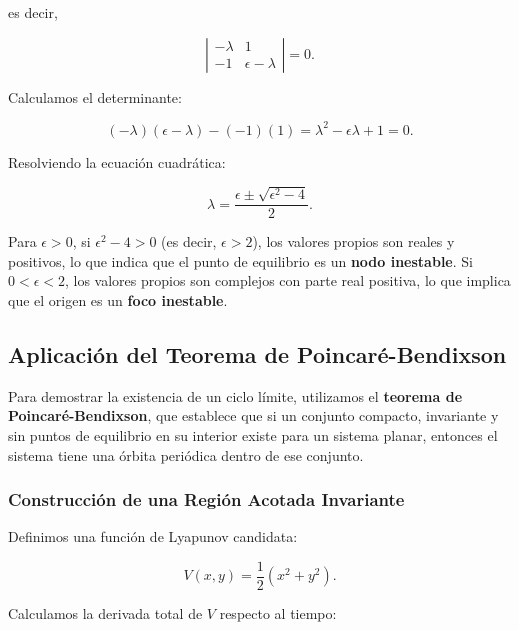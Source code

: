 \documentclass[12pt, a4paper]{report}
\begin{document}
es decir,

\begin{equation}
    \left| \begin{array}{cc}
        -\lambda & 1 \\
        -1 & \epsilon - \lambda
    \end{array} \right| = 0.
\end{equation}

Calculamos el determinante:

\begin{equation}
    (-\lambda)(\epsilon - \lambda) - (-1)(1) = \lambda^2 - \epsilon \lambda + 1 = 0.
\end{equation}

Resolviendo la ecuación cuadrática:

\begin{equation}
    \lambda = \frac{\epsilon \pm \sqrt{\epsilon^2 - 4}}{2}.
\end{equation}

Para \(\epsilon > 0\), si \(\epsilon^2 - 4 > 0\) (es decir, \(\epsilon > 2\)), los valores propios son reales y positivos, lo que indica que el punto de equilibrio es un \textbf{nodo inestable}. Si \(0 < \epsilon < 2\), los valores propios son complejos con parte real positiva, lo que implica que el origen es un \textbf{foco inestable}.

\subsection*{Aplicación del Teorema de Poincaré-Bendixson}

Para demostrar la existencia de un ciclo límite, utilizamos el \textbf{teorema de Poincaré-Bendixson}, que establece que si un conjunto compacto, invariante y sin puntos de equilibrio en su interior existe para un sistema planar, entonces el sistema tiene una órbita periódica dentro de ese conjunto.

\subsubsection{Construcción de una Región Acotada Invariante}

Definimos una función de Lyapunov candidata:

\begin{equation}
    V(x, y) = \dfrac{1}{2} \left( x^2 + y^2 \right).
\end{equation}

Calculamos la derivada total de \( V \) respecto al tiempo:
\end{document}
